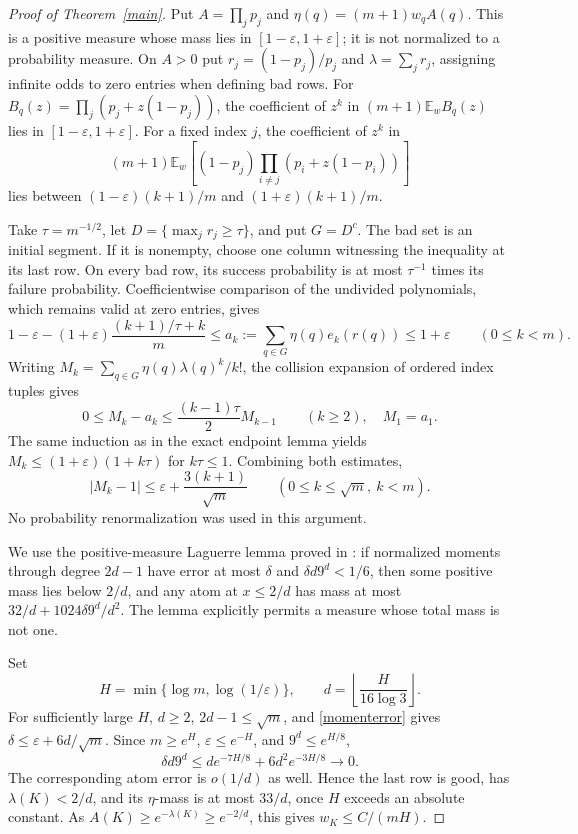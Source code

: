 \documentclass[11pt]{article}
\newcommand{\E}{\mathbb E}
\begin{document}
\begin{proof}[Proof of Theorem~\ref{main}]
Put $A=\prod_jp_j$ and $\eta(q)=(m+1)w_qA(q)$.
This is a positive measure whose mass lies in $[1-\varepsilon,1+\varepsilon]$;
it is not normalized to a probability measure. On $A>0$ put
$r_j=(1-p_j)/p_j$ and $\lambda=\sum_jr_j$, assigning infinite odds to
zero entries when defining bad rows.
For $B_q(z)=\prod_j(p_j+z(1-p_j))$, the coefficient of $z^k$ in
$(m+1)\E_wB_q(z)$ lies in $[1-\varepsilon,1+\varepsilon]$.
For a fixed index $j$, the coefficient of $z^k$ in
\[
 (m+1)\E_w\left[(1-p_j)\prod_{i\ne j}(p_i+z(1-p_i))\right]
\]
lies between $(1-\varepsilon)(k+1)/m$ and
$(1+\varepsilon)(k+1)/m$.

Take $\tau=m^{-1/2}$, let $D=\{\max_jr_j\ge\tau\}$, and put $G=D^c$.
The bad set is an initial segment. If it is nonempty, choose one
column witnessing the inequality at its last row. On every bad row,
its success probability is at most $\tau^{-1}$ times its failure
probability. Coefficientwise comparison of the undivided polynomials,
which remains valid at zero entries, gives
\[
 1-\varepsilon-(1+\varepsilon)
             \frac{(k+1)/\tau+k}{m}
 \le a_k:=\sum_{q\in G}\eta(q)e_k(r(q))\le1+\varepsilon
 \qquad(0\le k<m).
\]
Writing
$M_k=\sum_{q\in G}\eta(q)\lambda(q)^k/k!$, the collision expansion
of ordered index tuples gives
\[
 0\le M_k-a_k\le\frac{(k-1)\tau}{2}M_{k-1}\qquad(k\ge2),
 \quad M_1=a_1.
\]
The same induction as in the exact endpoint lemma yields
$M_k\le(1+\varepsilon)(1+k\tau)$ for $k\tau\le1$.
Combining both estimates,
\begin{equation}\label{momenterror}
 |M_k-1|\le\varepsilon+\frac{3(k+1)}{\sqrt m}
 \qquad(0\le k\le\sqrt m,\ k<m).
\end{equation}
No probability renormalization was used in this argument.

We use the positive-measure Laguerre lemma proved in
:
if normalized moments through degree $2d-1$ have error at most $\delta$
and $\delta d9^d<1/6$, then some positive mass lies below $2/d$, and
any atom at $x\le2/d$ has mass at most
$32/d+1024\delta9^d/d^2$. The lemma explicitly permits a measure
whose total mass is not one.

Set
\[
 H=\min\{\log m,\log(1/\varepsilon)\},\qquad
 d=\left\lfloor\frac{H}{16\log3}\right\rfloor.
\]
For sufficiently large $H$, $d\ge2$, $2d-1\le\sqrt m$, and
\eqref{momenterror} gives $\delta\le\varepsilon+6d/\sqrt m$.
Since $m\ge e^H$, $\varepsilon\le e^{-H}$, and $9^d\le e^{H/8}$,
\[
 \delta d9^d\le d e^{-7H/8}+6d^2e^{-3H/8}\longrightarrow0.
\]
The corresponding atom error is $o(1/d)$ as well. Hence the last
row is good, has $\lambda(K)<2/d$, and its $\eta$-mass is at most
$33/d$, once $H$ exceeds an absolute constant. As
$A(K)\ge e^{-\lambda(K)}\ge e^{-2/d}$, this gives
$w_K\le C/(mH)$.


\end{proof}
\end{document}
